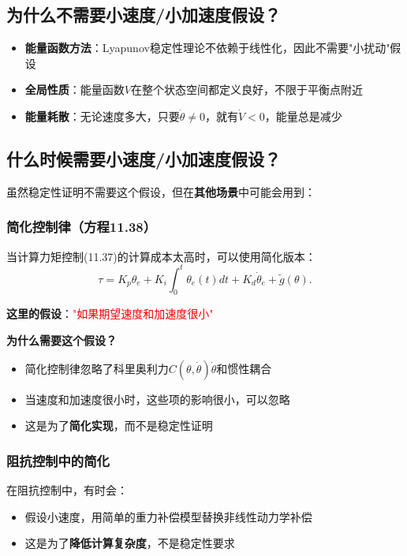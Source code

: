 \documentclass{article}
\begin{document}
\subsection{为什么不需要小速度/小加速度假设？}

\begin{itemize}
\item \textbf{能量函数方法}：Lyapunov稳定性理论不依赖于线性化，因此不需要"小扰动"假设
\item \textbf{全局性质}：能量函数$V$在整个状态空间都定义良好，不限于平衡点附近
\item \textbf{能量耗散}：无论速度多大，只要$\dot{\theta} \neq 0$，就有$\dot{V} < 0$，能量总是减少
\end{itemize}

\subsection{什么时候需要小速度/小加速度假设？}

虽然稳定性证明不需要这个假设，但在\textbf{其他场景}中可能会用到：

\subsubsection{简化控制律（方程11.38）}

当计算力矩控制(11.37)的计算成本太高时，可以使用简化版本：
\begin{equation}
\tau = K_p\theta_e + K_i\int_0^t\theta_e(t)dt + K_d\dot{\theta}_e + \tilde{g}(\theta).
\end{equation}

\textbf{这里的假设}：\textcolor{red}{"如果期望速度和加速度很小"}

\textbf{为什么需要这个假设？}
\begin{itemize}
\item 简化控制律忽略了科里奥利力$C(\theta, \dot{\theta})\dot{\theta}$和惯性耦合
\item 当速度和加速度很小时，这些项的影响很小，可以忽略
\item 这是为了\textbf{简化实现}，而不是稳定性证明
\end{itemize}

\subsubsection{阻抗控制中的简化}

在阻抗控制中，有时会：
\begin{itemize}
\item 假设小速度，用简单的重力补偿模型替换非线性动力学补偿
\item 这是为了\textbf{降低计算复杂度}，不是稳定性要求
\end{itemize}
\end{document}
